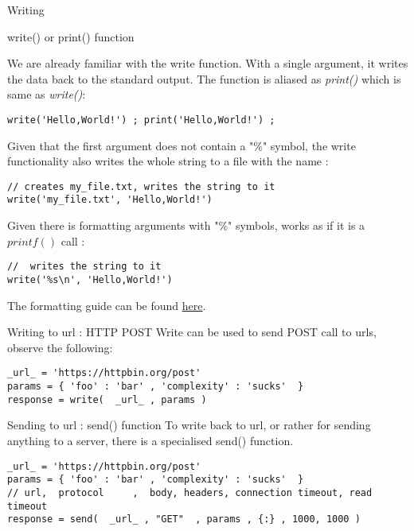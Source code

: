 \begin{section}{Writing}

\begin{subsection}{write() or print() function}

We are already familiar with the write function.
With a single argument, it writes the data back to the standard output.
The function is aliased as \emph{print()} which is same as \emph{write()}:
\begin{lstlisting}[style=JexlStyle]
write('Hello,World!') ; print('Hello,World!') ; 
\end{lstlisting}

Given that the first argument does not contain a "\%" symbol,
the write functionality also writes the whole string to a file
with the name :
\begin{lstlisting}[style=JexlStyle]
// creates my_file.txt, writes the string to it 
write('my_file.txt', 'Hello,World!')
\end{lstlisting}

Given there is formatting arguments with "\%" symbols, 
works as if it is a $printf()$ call :
\begin{lstlisting}[style=JexlStyle]
//  writes the string to it 
write('%s\n', 'Hello,World!')
\end{lstlisting}
The formatting guide can be found 
\href{https://sharkysoft.com/archive/printf/docs/javadocs/lava/clib/stdio/doc-files/specification.htm}{here}. 
\end{subsection}

\begin{subsection}{Writing to url : HTTP POST}
Write can be used to send POST call to urls, observe the following:
\begin{lstlisting}[style=JexlStyle]
_url_ = 'https://httpbin.org/post'
params = { 'foo' : 'bar' , 'complexity' : 'sucks'  }
response = write(  _url_ , params )
\end{lstlisting}
\end{subsection}

\begin{subsection}{Sending to url : send() function}
To write back to url, or rather for sending anything to a server,
there is a specialised send() function.

\begin{lstlisting}[style=JexlStyle]
_url_ = 'https://httpbin.org/post'
params = { 'foo' : 'bar' , 'complexity' : 'sucks'  }
// url,  protocol     ,  body, headers, connection timeout, read timeout  
response = send(  _url_ , "GET"  , params , {:} , 1000, 1000 )
\end{lstlisting}


\end{subsection}
\end{section}
